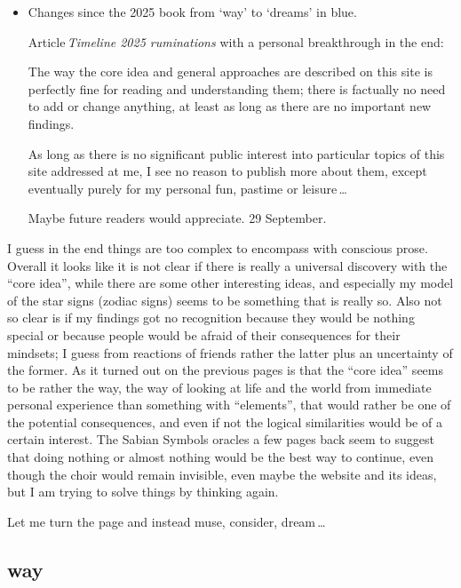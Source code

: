 {\small
\begin{itemize}

\item[ ]
Changes since the 2025 book from ‘way’ to ‘dreams’ in {\color{odyssey}blue}.

Article\,\textsl{Timeline 2025 ruminations} with a personal breakthrough in the end:

The way the core idea and general approaches are described on this site
is perfectly fine for reading and understanding them;
there is factually no need to add or change anything,
at least as long as there are no important new findings.

As long as there is no significant public interest
into particular topics of this site addressed at me,
I see no reason to publish more about them,
except eventually purely for my personal fun, pastime or leisure\,…

Maybe future readers would appreciate.
%
29 September.

\end{itemize}

\normalsize
\noindent
I guess in the end things are too complex
to encompass with conscious prose.
%
Overall it looks like it is not clear
if there is really a universal discovery with the “core idea”,
while there are some other interesting ideas,
and especially my model of the star signs (zodiac signs)
seems to be something that is really so.
%
Also not so clear is if my findings got no recognition
because they would be nothing special
or because people would be afraid of their consequences for their mindsets;
I guess from reactions of friends
rather the latter plus an uncertainty of the former.
%
As it turned out on the previous pages is that the “core idea”
seems to be rather the way,
the way of looking at life and the world
from immediate personal experience
than something with “elements”,
that would rather be one of the potential consequences,
and even if not the logical similarities
would be of a certain interest.
%
The Sabian Symbols oracles a few pages back
seem to suggest that doing nothing or almost nothing
would be the best way to continue,
even though the choir would remain invisible,
even maybe the website and its ideas,
but I am trying to solve things by thinking again.

Let me turn the page and instead muse, consider, dream\,…

\subsection{way}

}
